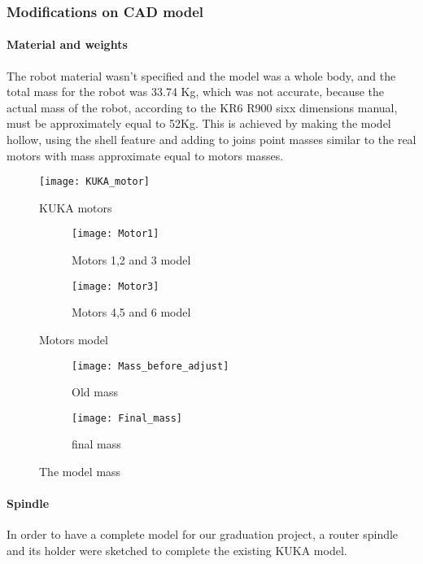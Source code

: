 \documentclass{book}
\begin{document}
\subsubsection{Modifications on CAD model}
 \paragraph{Material and weights}
 The robot material wasn’t specified and the model was a whole body, and the total mass for the robot was 33.74 Kg, which was not accurate, because the actual mass of the robot, according to the KR6 R900 sixx dimensions manual, must be approximately equal to 52Kg. This is achieved by making the model hollow, using the shell feature and adding to joins point masses similar to the real motors with mass approximate equal to motors masses. 

\begin{figure}[h]
	
	\caption{KUKA motors}
	\centering
	\texttt{[image: KUKA\_motor]}
\end{figure}

\begin{figure}
	\begin{subfigure}{0.5\textwidth}
	\centering
	\texttt{[image: Motor1]}
	\caption{Motors 1,2 and 3 model}
	\label{fig:sfig1}
\end{subfigure}%
\begin{subfigure}{0.5\textheight}
		
		\centering
		\texttt{[image: Motor3]}
		\caption{Motors 4,5 and 6 model}
		\label{fig:sfig2}
\end{subfigure}
\caption{Motors model}
\label{fig:fig}
\end{figure}

\begin{figure}
	\begin{subfigure}{0.6\textwidth}
	\centering
	\texttt{[image: Mass\_before\_adjust]}
	\caption{Old mass}
	\label{fig:sfig1}
\end{subfigure}%
\begin{subfigure}{0.5\textheight}
	\centering
	\texttt{[image: Final\_mass]}
	\caption{final mass}
	\label{fig:sfig2}
\end{subfigure}
\caption{The model mass}
\label{fig:fig}
\end{figure}
	
\newpage
 
\paragraph{Spindle}
In order to have a complete model for our graduation project, a router spindle and its holder were sketched to complete the existing KUKA model.
\end{document}
